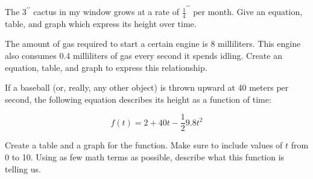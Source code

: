 \begin{exercise}
	The $3^{\prime\prime}$ cactus in my window grows at a rate of $\frac{1}{4}^{\prime\prime}$ per month.  Give an equation, table, and graph which express its height over time.
\end{exercise}
\bigskip

\begin{exercise}

The amount of gas required to start a certain engine is 8 milliliters.  This engine also consumes 0.4 milliliters of gas every second it spends idling.  Create an equation, table, and graph to express this relationship.

\end{exercise}
\bigskip

\begin{exercise}
If a baseball (or, really, any other object) is thrown upward at 40 meters per second, the following equation describes its height as a function of time:

$$f(t) = 2 + 40t - \frac{1}{2}9.8t^2$$

Create a table and a graph for the function.  Make sure to include values of $t$ from 0 to 10.  Using as few math terms as possible, describe what this function is telling us.

\end{exercise}
\bigskip







